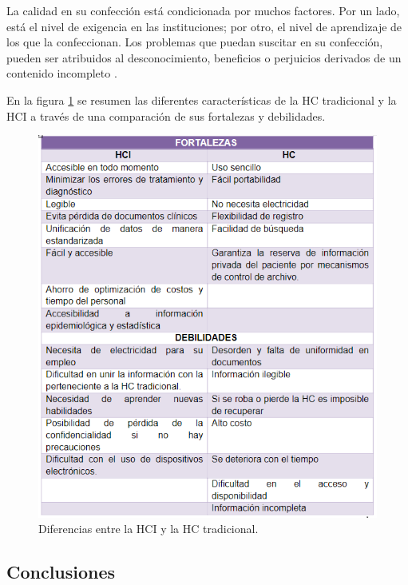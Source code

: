 La calidad en su confección está condicionada por muchos factores. Por un lado, está el nivel de exigencia en las instituciones; por otro, el nivel de aprendizaje de los que la confeccionan. Los problemas que puedan suscitar en su confección, pueden ser atribuidos al desconocimiento, beneficios o perjuicios derivados de un contenido incompleto  .

En la figura \ref{HCIvsHC} se resumen las diferentes características de la HC tradicional y la HCI a través de una comparación de sus fortalezas y debilidades.


\begin{center}
	\begin{figure}
		\caption{Diferencias entre la HCI y la HC tradicional. }
		\label{HCIvsHC}
		\includegraphics[]{MainMatter/HCIvsHC.PNG}
	\end{figure}
\end{center}


\subsection{Conclusiones}\label{chapter:introduction}



